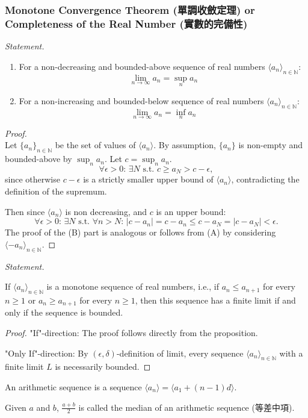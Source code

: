 \documentclass[a4paper,12pt]{report}
\begin{document}
\subsubsection{Monotone Convergence Theorem (單調收斂定理) or Completeness of the Real Number (實數的完備性)}
\textit{Statement.}
\begin{enumerate}[label=(\Alph*)]
\item For a non-decreasing and bounded-above sequence of real numbers $\langle a_n\rangle_{n\in\mathbb {N}}$:
\[\lim_{n\to\infty}a_n=\sup_n a_n\]
\item For a non-increasing and bounded-below sequence of real numbers $\langle a_n\rangle_{n\in\mathbb {N}}$:
\[\lim_{n\to\infty}a_n=\inf_n a_n\]
\end{enumerate}
\begin{proof}\mbox{}\\
Let $\{a_{n}\}_{n\in\mathbb {N}}$ be the set of values of $\langle a_n\rangle$. By assumption, $\{a_n\}$ is non-empty and bounded-above by $\sup_n a_n$. Let $c=\sup_n a_n$.
\[\forall\epsilon>0:\,\exists N\text{\ s.t.\ }c\geq a_N>c-\epsilon,\]
since otherwise $c-\epsilon$ is a strictly smaller upper bound of $\langle a_n\rangle$, contradicting the definition of the supremum. 

Then since $\langle a_n\rangle$ is non decreasing, and $c$ is an upper bound:
\[\forall\epsilon>0:\,\exists N\text{\ s.t.\ }\forall n>N:\,|c-a_n|=c-a_n\leq c-a_N=|c-a_N|<\epsilon.\]
The proof of the (B) part is analogous or follows from (A) by considering $\langle -a_{n}\rangle_{n\in \mathbb{N}}$.
\end{proof}
\textit{Statement.}

If $\langle a_n\rangle_{n\in\mathbb {N}}$ is a monotone sequence of real numbers, i.e., if 
$a_n\leq a_{n+1}$ for every $n\geq 1$ or $a_n\geq a_{n+1}$ for every $n\geq 1$, then this sequence has a finite limit if and only if the sequence is bounded.
\begin{proof}
"If"-direction: The proof follows directly from the proposition.

"Only If"-direction: By $(\epsilon,\delta)$-definition of limit, every sequence $\langle a_n\rangle_{n\in\mathbb {N}}$ with a finite limit $L$ is necessarily bounded.
\end{proof}
An arithmetic sequence is a sequence $\langle a_n\rangle=\langle a_1+(n-1)d\rangle$. 

Given $a$ and $b$, $\frac{a+b}{2}$ is called the median of an arithmetic sequence (等差中項).
\end{document}
